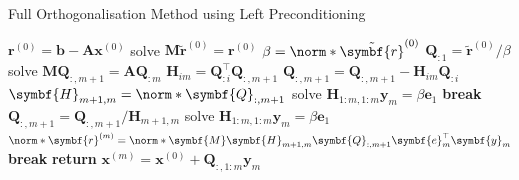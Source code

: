 \documentclass{article}
\begin{document}
\begin{algorithm}[H]
    \caption{Full Orthogonalisation Method using Left Preconditioning}
    \begin{algorithmic}
        \State \(\symbf{r}^{\left( 0 \right)} = \symbf{b} - \symbf{A} \symbf{x}^{\left( 0 \right)}\)
        \State solve \(\symbf{M} \tilde{\symbf{r}}^{\left( 0 \right)} = \symbf{r}^{\left( 0 \right)}\) 
        \State \(\beta = \norm*{\tilde{\symbf{r}}^{\left( 0 \right)}}\)
        \State \(\symbf{Q}_{:1} = \tilde{\symbf{r}}^{\left( 0 \right)}/\beta\)
        \State solve \(\symbf{M} \symbf{Q}_{:,m+1} = \symbf{A} \symbf{Q}_{:m}\) 
        \State \(\symbf{H}_{im} = \symbf{Q}_{:i}^\top \symbf{Q}_{:,m + 1}\)
        \State \(\symbf{Q}_{:,m+1} = \symbf{Q}_{:,m+1} - \symbf{H}_{im} \symbf{Q}_{:i}\)
        \EndFor
        \State \(\symbf{H}_{m+1,m} = \norm*{\symbf{Q}_{:,m+1}}\)
        \Statex
        \State solve \(\symbf{H}_{1:m,1:m} \symbf{y}_m = \beta \symbf{e}_1\)
        \State \textbf{break}
        \EndIf
        \State \(\symbf{Q}_{:,m+1} = \symbf{Q}_{:,m+1} / \symbf{H}_{m+1,m}\)
        \Statex
        \State solve \(\symbf{H}_{1:m,1:m} \symbf{y}_m = \beta \symbf{e}_1\)
        \State \(\norm*{\symbf{r}^{\left( m \right)}} = \norm*{\symbf{M} \symbf{H}_{m+1,m} \symbf{Q}_{:,m+1} \symbf{e}_m^\top \symbf{y}_m}\) 
        \State \textbf{break}
        \EndIf
        \EndFor
        \State \textbf{return} \(\symbf{x}^{\left( m \right)} = \symbf{x}^{\left( 0 \right)} + \symbf{Q}_{:,1:m} \symbf{y}_m\)
    \end{algorithmic}
\end{algorithm}
\end{document}
